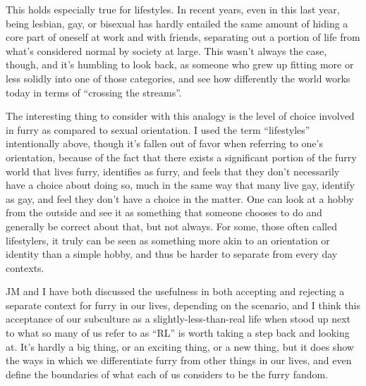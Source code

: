 This holds especially true for lifestyles. In recent years, even in this last year, being lesbian, gay, or bisexual has hardly entailed the same amount of hiding a core part of oneself at work and with friends, separating out a portion of life from what's considered normal by society at large. This wasn't always the case, though, and it's humbling to look back, as someone who grew up fitting more or less solidly into one of those categories, and see how differently the world works today in terms of ``crossing the streams''.

The interesting thing to consider with this analogy is the level of choice involved in furry as compared to sexual orientation. I used the term ``lifestyles'' intentionally above, though it's fallen out of favor when referring to one's orientation, because of the fact that there exists a significant portion of the furry world that lives furry, identifies as furry, and feels that they don't necessarily have a choice about doing so, much in the same way that many live gay, identify as gay, and feel they don't have a choice in the matter. One can look at a hobby from the outside and see it as something that someone chooses to do and generally be correct about that, but not always. For some, those often called lifestylers, it truly can be seen as something more akin to an orientation or identity than a simple hobby, and thus be harder to separate from every day contexts.

JM and I have both discussed the usefulness in both accepting and rejecting a separate context for furry in our lives, depending on the scenario, and I think this acceptance of our subculture as a slightly-less-than-real life when stood up next to what so many of us refer to as ``RL'' is worth taking a step back and looking at. It's hardly a big thing, or an exciting thing, or a new thing, but it does show the ways in which we differentiate furry from other things in our lives, and even define the boundaries of what each of us considers to be the furry fandom.
